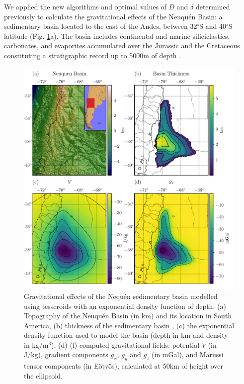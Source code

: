 \documentclass[extra, referee]{gji}
\begin{document}
We applied the new algorithms and optimal values of $D$ and $\delta$ determined
previously to calculate the gravitational effects of the Neuqu\'en Basin:
a sedimentary basin
located to the east of the Andes, between 32$^\circ$S and 40$^\circ$S latitude
(Fig. \ref{fig:neuquen-basin}a).
The basin includes continental and marine siliciclastics, carbonates, and evaporites
accumulated over the Jurassic and the Cretaceous constituting a stratigraphic record up
to 5000m of depth \citep{Howell2005}.

\begin{figure}
\centering
\includegraphics[width=\linewidth]{figures/neuquen-basin.pdf}
\caption{
    Gravitational effects of the Nequ\'en sedimentary basin modelled
    using tesseroids with an exponential density function of depth.
    (a) Topography of the Neuqu\'en Basin (in km) and its location in South America,
    (b) thickness of the sedimentary basin \citep[in meters;][]{Heine2007},
    (c) the exponential density function used to model the basin
        (depth in km and density in kg/m$^3$),
    (d)-(l) computed gravitational fields: potential $V$ (in J/kg), gradient
    components $g_x$, $g_y$ and $g_z$ (in mGal), and Marussi tensor components
    (in Eötvös), calculated at 50km of height over the ellipsoid.
}
\label{fig:neuquen-basin}
\end{figure}
\end{document}
